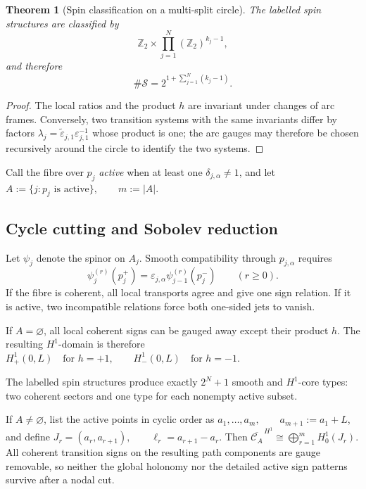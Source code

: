 \documentclass[11pt]{article}
\theoremstyle{plain}
\newtheorem{theorem}{Theorem}[section]
\theoremstyle{definition}
\begin{document}
\begin{theorem}[Spin classification on a multi-split circle]
\label{thm:multisplit-circle-spin-classification}
The labelled spin structures are classified by
\[
  \mathbb Z_2
  \times
  \prod_{j=1}^{N}
  (\mathbb Z_2)^{k_j-1},
\]
and therefore
\[
  \#\mathscr S
  =
  2^{
    1+\sum_{j=1}^{N}(k_j-1)
  }.
\]
\end{theorem}

\begin{proof}
The local ratios and the product \(h\) are invariant under changes of arc
frames. Conversely, two transition systems with the same invariants differ
by factors \(\lambda_j = \widetilde{\varepsilon}_{j,1} \varepsilon_{j,1}^{-1}\) whose product is one; the arc gauges may therefore be chosen recursively
around the circle to identify the two systems.
\end{proof}

Call the fibre over \(p_j\) \emph{active} when at least one
\(\delta_{j,\alpha}\neq1\), and let
\(A := \{j:p_j\text{ is active}\}, \qquad m:=|A|\).

\subsection{Cycle cutting and Sobolev reduction}
\label{subsec:multisplit-circle-H1}

Let \(\psi_j\) denote the spinor on \(A_j\). Smooth compatibility through
\(p_{j,\alpha}\) requires
\[
  \psi_j^{(r)}(p_j^+)
  =
  \varepsilon_{j,\alpha}
  \psi_{j-1}^{(r)}(p_j^-)
  \qquad
  (r\geq0).
\]
If the fibre is coherent, all local transports agree and give one sign
relation. If it is active, two incompatible relations force both one-sided
jets to vanish.

If \(A=\varnothing\), all local coherent signs can be gauged away except
their product \(h\). The resulting \(H^1\)-domain is therefore
\(H^1_+(0,L) \quad\text{for }h=+1, \qquad H^1_-(0,L) \quad\text{for }h=-1\).

The labelled spin structures produce exactly \(2^N+1\) smooth and \(H^1\)-core types: two coherent sectors and one type for each
nonempty active subset.

If \(A\neq\varnothing\), list the active points in cyclic order as
\(a_1,\ldots,a_m, \qquad a_{m+1}:=a_1+L\),
and define
\(J_r=(a_r,a_{r+1}), \qquad \ell_r=a_{r+1}-a_r\).
Then
\(\overline{\mathcal C_A}^{\,H^1} \cong \bigoplus_{r=1}^{m}H^1_0(J_r)\).
All coherent transition signs on the resulting path components are gauge
removable, so neither the global holonomy nor the detailed active sign
patterns survive after a nodal cut.
\end{document}
